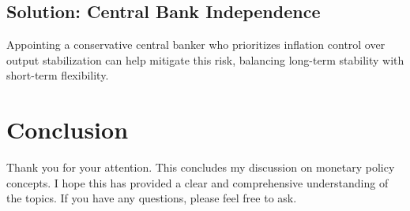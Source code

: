 \documentclass{article}
\begin{document}
\subsection{Solution: Central Bank Independence}
Appointing a conservative central banker who prioritizes inflation control over output stabilization can help mitigate this risk, balancing long-term stability with short-term flexibility.

\section{Conclusion}
Thank you for your attention. This concludes my discussion on monetary policy concepts. I hope this has provided a clear and comprehensive understanding of the topics. If you have any questions, please feel free to ask.
\end{document}
